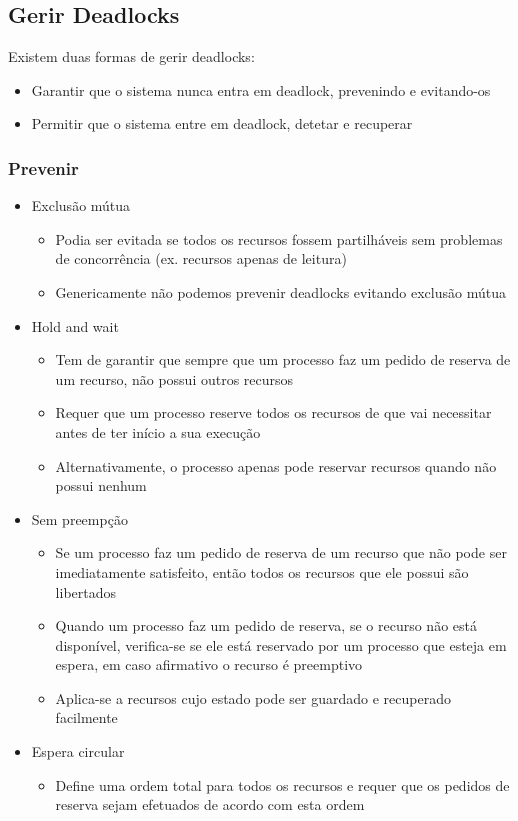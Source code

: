 \documentclass[10pt,a4paper]{report}
\begin{document}
\subsection{Gerir Deadlocks}
Existem duas formas de gerir deadlocks:
\begin{itemize}
\item Garantir que o sistema nunca entra em deadlock, prevenindo e evitando-os
\item Permitir que o sistema entre em deadlock, detetar e recuperar
\end{itemize}
\subsubsection{Prevenir}
\begin{itemize}
\item Exclusão mútua
\begin{itemize}
\item Podia ser evitada se todos os recursos fossem partilháveis sem problemas de concorrência (ex. recursos apenas de leitura)
\item Genericamente não podemos prevenir deadlocks evitando exclusão mútua
\end{itemize}
\item Hold and wait
\begin{itemize}
\item Tem de garantir que sempre que um processo faz um pedido de reserva de um recurso, não possui outros recursos
\item Requer que um processo reserve todos os recursos de que vai necessitar antes de ter início a sua execução
\item Alternativamente, o processo apenas pode reservar recursos quando não possui nenhum
\end{itemize}
\item Sem preempção
\begin{itemize}
\item Se um processo faz um pedido de reserva de um recurso que não pode ser imediatamente satisfeito, então todos os recursos que ele possui são libertados
\item Quando um processo faz um pedido de reserva, se o recurso não está disponível, verifica-se se ele está reservado por um processo que esteja em espera, em caso afirmativo o recurso é preemptivo
\item Aplica-se a recursos cujo estado pode ser guardado e recuperado facilmente
\end{itemize}
\item Espera circular
\begin{itemize}
\item Define uma ordem total para todos os recursos e requer que os pedidos de reserva sejam efetuados de acordo com esta ordem
\end{itemize}
\end{itemize}
\end{document}
